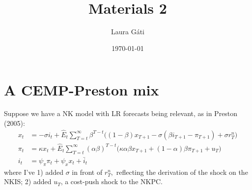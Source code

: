 \documentclass[11pt]{article}
\renewcommand{\[}{\begin{equation}}
\renewcommand{\]}{\end{equation}}
\begin{document}
\linespread{1.0}

\title{Materials 2}
\author{Laura G\'ati} 
\date{\today}
\maketitle


\tableofcontents



\section{A CEMP-Preston mix}

Suppose we have a NK model with LR forecasts being relevant, as in Preston (2005):
\begin{align}
x_t &=  -\sigma i_t +\hat{E}_t \sum_{T=t}^{\infty} \beta^{T-t }\big( (1-\beta)x_{T+1} - \sigma(\beta i_{T+1} - \pi_{T+1}) +\sigma r_T^n \big) \tag{Preston, eq. (18)} \\
\pi_t &= \kappa x_t +\hat{E}_t \sum_{T=t}^{\infty} (\alpha\beta)^{T-t }\big( \kappa \alpha \beta x_{T+1} + (1-\alpha)\beta \pi_{T+1} + u_T\big)\tag{Preston, eq. (19)} \\
i_t &= \psi_{\pi}\pi_t + \psi_{x} x_t + \bar{i}_t \tag{Preston, eq. (27)} 
\end{align}
 where I've 1) added $\sigma$ in front of $r_T^n,$ reflecting the derivation of the shock on the NKIS; 2) added $u_T$, a cost-push shock to the NKPC. 
 
\end{document}
